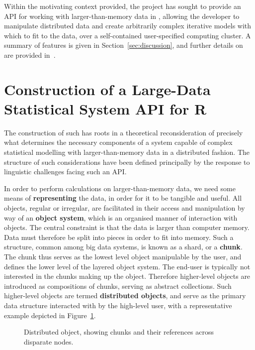 \documentclass[letterpaper, inpress]{jds} %
\begin{document}
Within the motivating context provided, the  project has sought to provide an API for working with larger-than-memory data in , allowing the developer to manipulate distributed data and create arbitrarily complex iterative models with which to fit to the data, over a self-contained user-specified computing cluster. A summary of features is given in Section~\ref{sec:discussion}, and further details on  are provided in~\citet{cairns2024}.

\section{Construction of a Large-Data Statistical System API for R}

The construction of such  has roots in a theoretical reconsideration of precisely what determines the necessary components of a system capable of complex statistical modelling with larger-than-memory data in a distributed fashion.
The structure of such considerations have been defined principally by the response to linguistic challenges facing such an API.

In order to perform calculations on larger-than-memory data, we need some means of \textbf{representing} the data, in order for it to be tangible and useful.
All objects, regular or irregular, are facilitated in their access and manipulation by way of an \textbf{object system}, which is an organised manner of interaction with objects.
The central constraint is that the data is larger than computer memory.
Data must therefore be split into pieces in order to fit into memory.
Such a structure, common among big data systems, is known as a shard, or a \textbf{chunk}. 
The chunk thus serves as the lowest level object manipulable by the user, and defines the lower level of the layered object system.
The end-user is typically not interested in the chunks making up the object.
Therefore higher-level objects are introduced as compositions of chunks, serving as abstract collections.
Such higher-level objects are termed \textbf{distributed objects}, and serve as the primary data structure interacted with by the high-level user, with a representative example depicted in Figure~\ref{fig:distobj}.

\begin{figure}[ht]
\begin{center}
    
\caption{Distributed object, showing chunks and their references across disparate nodes.}
\label{fig:distobj}
\end{center}
\end{figure}
\end{document}
